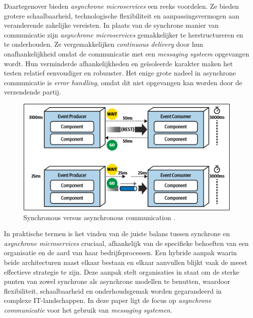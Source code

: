 Daartegenover bieden \emph{asynchrone microservices} een reeks voordelen. Ze bieden grotere schaalbaarheid, technologische 
flexibiliteit en aanpassingsvermogen aan veranderende zakelijke vereisten. 
In plaats van de synchrone manier van communicatie zijn \emph{asynchrone microservices} 
gemakkelijker te herstructureren en te onderhouden. 
Ze vergemakkelijken \emph{continuous delivery} door hun onafhankelijkheid omdat de communicatie 
met een \emph{messaging systeem} opgevangen wordt. Hun verminderde afhankelijkheden en 
geïsoleerde karakter maken het testen relatief eenvoudiger en robuuster.
Het enige grote nadeel in asynchrone communicatie is \emph{error handling}, 
omdat dit niet opgevangen kan worden door de verzendende partij.
\newline

\begin{figure}[H]
  \centering
  \includegraphics[width=.5\textwidth]{../voorstel/img/synchronous_vs_async_calls.png}
  \caption{\label{fig:img}Synchronous versus asynchronous communication \autocite[figure 14 -- 13]{MarkRichards2021}.}
\end{figure}

In praktische termen is het vinden van de juiste balans tussen synchrone en \emph{asynchrone microservices} cruciaal, 
afhankelijk van de specifieke behoeften van een organisatie en de aard van haar bedrijfsprocessen. 
Een hybride aanpak waarin beide architecturen naast elkaar bestaan en elkaar aanvullen blijkt vaak de meest effectieve strategie te zijn. 
Deze aanpak stelt organisaties in staat om de sterke punten van zowel synchrone als asynchrone modellen te benutten, 
waardoor flexibiliteit, schaalbaarheid en onderhoudsgemak worden gegarandeerd in complexe \newline IT-landschappen.
In deze paper ligt de focus op \emph{asynchrone communicatie} voor het gebruik van \emph{messaging systemen}.
\newline

